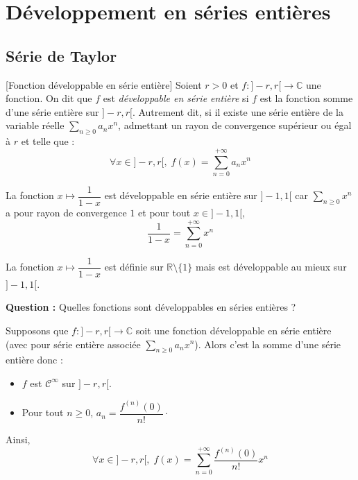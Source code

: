 \documentclass[french,11pt,twoside]{VcCours}
\begin{document}
\section{Développement en séries entières}
\subsection{Série de Taylor}

\begin{Definition}{}[Fonction développable en série entière]
Soient $r>0$ et $f : ]-r,r[ \rightarrow \mathbb{C}$ une fonction. On dit que $f$ est \emph{développable en série entière} si $f$ est la fonction somme d'une série entière sur $]-r,r[$. Autrement dit, si il existe une série entière de la variable réelle $\sum_{n \geq 0} a_n x^n$, admettant un rayon de convergence supérieur ou égal à $r$ et telle que :
$$ \forall x \in ]-r,r[, \; f(x) = \sum_{n=0}^{+ \infty} a_n x^n$$
\end{Definition}

\begin{Exemple}{} La fonction $x \mapsto \dfrac{1}{1-x}$ est développable en série entière sur $]-1,1[$ car $\sum_{n \geq 0} x^n$ a pour rayon de convergence $1$ et pour tout $x \in ]-1,1[$,
$$ \frac{1}{1-x}= \sum_{n=0}^{+ \infty} x^n$$
\end{Exemple}

\begin{Remarque}[\alerte]{} La fonction $x \mapsto \dfrac{1}{1-x}$ est définie sur $\mathbb{R} \setminus \lbrace 1 \rbrace$ mais est développable au mieux sur $]-1,1[$.
\end{Remarque}

\medskip

\textbf{Question :} Quelles fonctions sont développables en séries entières ?

\medskip

Supposons que $f : ]-r,r[ \rightarrow \mathbb{C}$ soit une fonction développable en série entière (avec pour série entière associée $\sum_{n \geq 0} a_n x^n$). Alors c'est la somme d'une série entière donc :
\begin{itemize}
\item $f$ est $\mathcal{C}^{\infty}$ sur $]-r,r[$.
\item Pour tout $n \geq 0$, $a_n = \dfrac{f^{(n)}(0)}{n!} \cdot$
\end{itemize}
Ainsi,
$$ \forall x \in ]-r,r[, \; f(x)= \sum_{n=0}^{+ \infty} \dfrac{f^{(n)}(0)}{n!}  x^n$$

\medskip
\end{document}
